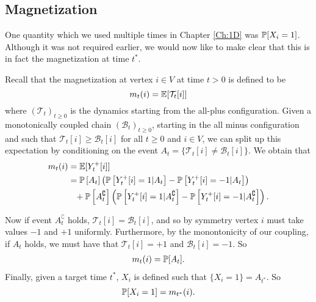 \subsection{Magnetization}
One quantity which we used multiple times in Chapter \ref{Ch:1D} was $\mathbb{P}[X_i = 1]$. Although it was not required earlier, we would now like to make clear that this is in fact the magnetization at time $t^*$. 

Recall that the magnetization at vertex $i \in V$ at time $t > 0$ is defined to be
\begin{equation}
	m_t(i) = \mathbb{E}[\mathcal{T}_t[i]]
\end{equation}
where $(\mathcal{T}_t)_{t \geq 0}$ is the dynamics starting from the all-plus configuration. %
Given a monotonically coupled chain $(\mathcal{B}_t)_{t\geq0}$, starting in the all minus configuration and such that $\mathcal{T}_t[i] \geq \mathcal{B}_t[i]$ for all $t\geq 0$ and $i \in V$, we can split up this expectation by conditioning on the event $A_t = \{\mathcal{T}_t[i] \neq \mathcal{B}_t[i]\}$. We obtain that
\begin{align}
	m_t(i) &= \mathbb{E}[Y_t^+[i]]\\
	&= \mathbb{P}\left[A_t\right] \left(\mathbb{P}\left[Y_t^+[i] = 1 | A_t\right] - \mathbb{P}\left[Y_t^+[i] = -1|A_t\right]\right)  \\
	&\phantom{= } + \mathbb{P}\left[A_t^\complement\right] \left( \mathbb{P}\left[Y_t^+[i] = 1 |A_t^\complement\right] - \mathbb{P}\left[Y_t^+[i] = -1|A_t^\complement\right] \right). \notag
\end{align}

Now if event $A_t^\complement$ holds, $\mathcal{T}_t[i] = \mathcal{B}_t[i]$, and so by symmetry vertex $i$ must take values $-1$ and $+1$ uniformly. Furthermore, by the monontonicity of our coupling, if $A_t$ holds, we must have that $\mathcal{T}_t[i] = +1$ and $\mathcal{B}_t[i] = -1$.
So
\begin{align}
	m_t(i) = \mathbb{P}[A_t].
\end{align}
Finally, given a target time $t^*$, $X_i$ is defined such that $\{X_i = 1\} = A_{t^*}$. So 
\begin{equation}
	\label{eq:prob X_i = 1 is m_t*}
	\mathbb{P}[X_i = 1] = m_{t^*}(i).	
\end{equation}


